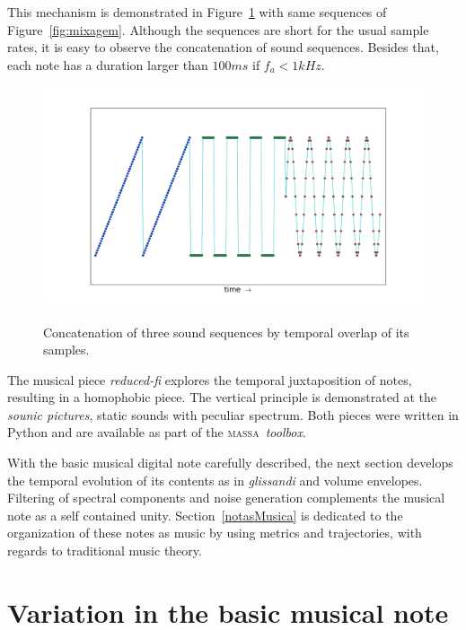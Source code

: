 \documentclass[
 aip,
 jmp,
 amsmath,amssymb,
 reprint,
]{revtex4-1}
\newcommand{\massa}{{\large \textsc{massa}}}
\begin{document}
This mechanism is demonstrated in Figure~\ref{fig:concatenacao} with same sequences of Figure~\ref{fig:mixagem}. Although the sequences are short for the usual sample rates, it is easy to observe the concatenation of sound sequences. Besides that, each note has a duration larger than $100ms$ if $f_a<1kHz$.

\begin{figure}[h!]
{    \centering
        \includegraphics[width=\columnwidth]{figures/concatenacao}}
    \caption{Concatenation of three sound sequences by temporal overlap of its samples.}
        \label{fig:concatenacao}
\end{figure}

The musical piece \emph{reduced-fi} explores the temporal juxtaposition of notes, resulting in a homophobic piece. The vertical principle is demonstrated at the \emph{sounic pictures}, static sounds with peculiar spectrum. Both pieces were written in Python and are available as part of the \massa\ \emph{toolbox}.\cite{MASSA}

With the basic musical digital note carefully described, the next section develops the temporal evolution of its contents as in \emph{glissandi} and volume envelopes. Filtering of spectral components and noise generation complements the musical note as a self contained unity. Section~\ref{notasMusica} is dedicated to the organization of these notes as music by using metrics and trajectories, with regards to traditional music theory.



\section{Variation in the basic musical note}\label{sec:internalVar}
\end{document}
